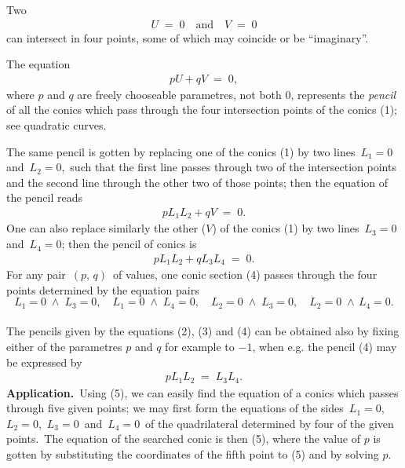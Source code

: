 \documentclass[12pt]{article}
\theoremstyle{definition}
\begin{document}
Two 
\begin{align}
U \;=\; 0 \quad \mbox{and} \quad V \;=\; 0
\end{align}
can intersect in four points, some of which may coincide or be ``imaginary''.

The equation
\begin{align}
pU+qV \;=\; 0,
\end{align}
where $p$ and $q$ are freely chooseable parametres, not both 0, represents the \emph{pencil} of all the conics which pass through the four intersection points of the conics (1); see quadratic curves. 

The same pencil is gotten by replacing one of the conics (1) by two lines \,$L_1 = 0$\, and\, $L_2 = 0$,\, such that the first line passes through two of the intersection points and the second line through the other two of those points; then the equation of the pencil reads
\begin{align}
pL_1L_2+qV \;=\; 0.
\end{align}
One can also replace similarly the other ($V$) of the conics (1) by two lines\, $L_3 = 0$\, and\, $L_4 = 0$; then the pencil of conics is
\begin{align}
pL_1L_2+qL_3L_4 \;=\; 0.
\end{align}
For any pair \,$(p,\,q)$\, of values, one conic section (4) passes through the four points determined by the equation pairs
$$L_1 = 0\;\land\;L_3 = 0, \quad L_1 = 0\;\land\;L_4 = 0, \quad L_2 = 0\;\land\;L_3 = 0,\quad L_2 = 0\;\land\,L_4 = 0.$$\\

The pencils given by the equations (2), (3) and (4) can be obtained also by fixing either of the parametres $p$ and $q$ for example to $-1$, when e.g. the pencil (4) may be expressed by
\begin{align}
pL_1L_2 \;=\; L_3L_4.
\end{align}
\textbf{Application.}\, Using (5), we can easily find the equation of a conics which passes through five given points; we may first form the equations of the sides\, $L_1 = 0$,\, $L_2 = 0$,\, $L_3 = 0$\, and\, $L_4 = 0$\, of the quadrilateral determined by four of the given points.\, The equation of the searched conic is then (5), where the value of $p$ is gotten by substituting the coordinates of the fifth point to (5) and by solving $p$.
\end{document}
